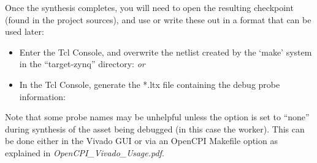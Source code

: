 \begin{flushleft}
Once the synthesis completes, you will need to open the resulting checkpoint (found in the project sources), and use  or  write these out in a format that can be used later:
\begin{itemize}
		\item Enter the Tcl Console, and overwrite the netlist created by the `make' system in the ``target-zynq'' directory:
			\subitem {}
			\subitem \textit{or}
			\subitem {}

		\item In the Tcl Console, generate the *.ltx file containing the debug probe information:
			\subitem {}
\end{itemize}
Note that some probe names may be unhelpful unless the  option is set to ``none'' during synthesis of the asset being debugged (in this case the worker). This can be done either in the Vivado GUI or via an OpenCPI Makefile option as explained in \textit{OpenCPI\_Vivado\_Usage.pdf}.\newline


\end{flushleft}
